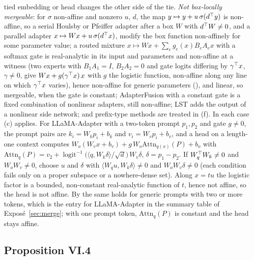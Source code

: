 tied embedding or head changes the other side of the tie. \emph{Not box-locally mergeable}: for $\sigma$ non-affine and nonzero
$u$, $d$, the map $y\mapsto y+u\,\sigma(d^{\top} y)$ is non-affine, so a serial Houlsby or Pfeiffer adapter after a box $W$ with
$d^{\top} W\ne0$, and a parallel adapter $x\mapsto Wx+u\,\sigma(d^{\top} x)$, modify the box function non-affinely for some parameter
value; a routed mixture $x\mapsto Wx+\sum_eg_e(x)B_eA_ex$ with a softmax gate is real-analytic in its input and parameters and
non-affine at a witness (two experts with $B_1A_1=I$, $B_2A_2=0$ and gate logits differing by $\gamma^{\top} x$, $\gamma\ne0$, give
$Wx+g(\gamma^{\top} x)\,x$ with $g$ the logistic function, non-affine along any line on which $\gamma^{\top} x$ varies), hence non-affine for
generic parameters (), and linear, so mergeable, when the gate is constant; AdapterFusion with a constant gate is a fixed combination of nonlinear adapters,
still non-affine; LST adds the output of a nonlinear side network; and prefix-type methods are treated in
(f). In each case (c) applies. For LLaMA-Adapter with a two-token prompt $p_1,p_2$ and gate $g\ne0$,
the prompt pairs are $k_i=W_kp_i+b_k$ and $v_i=W_vp_i+b_v$, and a head on a length-one context computes
$W_o(W_vx+b_v)+g\,W_o\mathrm{Attn}_{q(x)}(P)+b_o$ with
$\mathrm{Attn}_{q}(P)=v_2+\operatorname{logit}^{-1}\big(\langle q,W_k\delta\rangle/\sqrt d\big)\,W_v\delta$, $\delta=p_1-p_2$.
If $W_q^{\top} W_k\ne0$ and $W_oW_v\ne0$, choose $u$ and $\delta$ with $\langle W_qu,W_k\delta\rangle\ne0$ and $W_oW_v\delta\ne0$
(each condition fails only on a proper subspace or a nowhere-dense set). Along $x=tu$ the logistic factor is a bounded,
non-constant real-analytic function of $t$, hence not affine, so the head is not affine. By  the same holds for
generic prompts with two or more tokens, which is the entry for LLaMA-Adapter in the summary table of
Exposé~\ref{sec:merge}; with one prompt token, $\mathrm{Attn}_q(P)$ is constant and the head stays affine.

\subsection{Proposition VI.4}\label{proof:VI.4}

